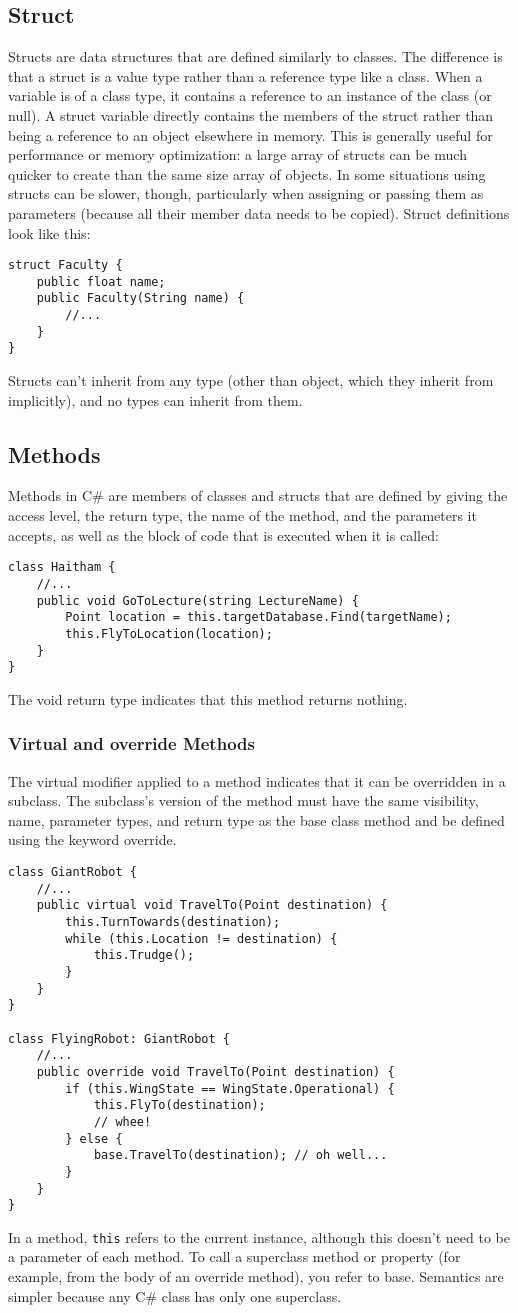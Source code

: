 \documentclass[12pt,a4paper,final,twoside,onecolumn,titlepage]{book}
\begin{document}
\subsection{Struct}
Structs are data structures that are defined similarly to classes. The difference is that a struct is a value type rather than a reference type like a class. When a variable is of a class type, it contains a reference to an instance of the class (or null). A struct variable directly contains the members of the struct rather than being a reference to an object elsewhere in memory. This is generally useful for performance or memory optimization: a large array of structs can be much quicker to create than the same size array of objects. In some situations using structs can be slower, though, particularly when assigning or passing them as parameters (because all their member data needs to be copied). 
Struct definitions look like this:
\begin{lstlisting}
struct Faculty { 
	public float name; 
	public Faculty(String name) {
		//...
	}
}
\end{lstlisting}
Structs can’t inherit from any type (other than object, which they inherit from
implicitly), and no types can inherit from them.
\subsection{Methods}
Methods in C\# are members of classes and structs that are defined by giving the access level, the return type, the name of the method, and the parameters it accepts, as well as the block of code that is executed when it is called:
\begin{lstlisting}
class Haitham { 
	//...
	public void GoToLecture(string LectureName) { 
		Point location = this.targetDatabase.Find(targetName); 
		this.FlyToLocation(location);
	}
}
\end{lstlisting}
The void return type indicates that this method returns nothing.
\subsubsection{Virtual and override Methods}
The virtual modifier applied to a method indicates that it can be overridden in a subclass. The subclass’s version of the method must have the same visibility, name, parameter types, and return type as the base class method and be defined using the keyword override.
\begin{lstlisting}
class GiantRobot { 
	//...
	public virtual void TravelTo(Point destination) { 
		this.TurnTowards(destination); 
		while (this.Location != destination) {
			this.Trudge();
		}
	}
}

class FlyingRobot: GiantRobot { 
	//...
	public override void TravelTo(Point destination) { 
		if (this.WingState == WingState.Operational) {
			this.FlyTo(destination); 
			// whee! 
		} else {
			base.TravelTo(destination); // oh well...
		}	
	}
}
\end{lstlisting}
In a method, \texttt{this} refers to the current instance, although this doesn’t need to be a parameter of each method. To call a superclass method or property (for example, from the body of an override method), you refer to base. Semantics are simpler because any C\# class has only one superclass.
\end{document}
